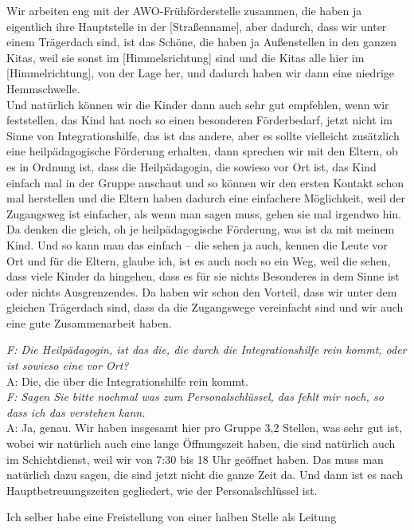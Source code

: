 \begin{linenumbers*}
Wir arbeiten eng mit der AWO-Frühförderstelle zusammen, die haben ja eigentlich
ihre Hauptstelle in der {[Straßenname]}, aber dadurch, dass wir unter einem Trägerdach sind, ist das Schöne, die haben ja Außenstellen in den ganzen Kitas, weil sie sonst im {[Himmelsrichtung]} sind und die Kitas alle hier im {[Himmelrichtung]}, von der Lage her, und dadurch haben wir dann eine niedrige Hemmschwelle.\\
Und natürlich können wir die Kinder dann auch sehr gut empfehlen, wenn wir feststellen, das Kind hat noch so einen besonderen Förderbedarf, jetzt nicht im Sinne von Integrationshilfe, das ist das andere, aber es sollte vielleicht zusätzlich eine heilpädagogische Förderung erhalten, dann sprechen wir mit den Eltern, ob es in Ordnung ist, dass die Heilpädagogin, die sowieso vor Ort ist, das Kind einfach mal in der Gruppe anschaut und so können wir den ersten Kontakt schon mal herstellen und die Eltern haben dadurch eine einfachere Möglichkeit, weil der Zugangsweg ist einfacher, als wenn man sagen muss, gehen sie mal irgendwo hin.\\
Da denken die gleich, oh je heilpädagogische Förderung, was ist da mit meinem Kind. Und so kann man das einfach -- die sehen ja auch, kennen die Leute vor Ort und für die Eltern, glaube ich, ist es auch noch so ein Weg, weil die sehen, dass viele Kinder da hingehen, dass es für sie nichts Besonderes in dem Sinne ist oder nichts Ausgrenzendes. Da haben wir schon den Vorteil, dass wir unter dem gleichen Trägerdach sind, dass da die Zugangswege vereinfacht sind und wir auch eine gute Zusammenarbeit haben. 

\emph{F: Die Heilpädagogin, ist das die, die durch die Integrationshilfe rein kommt, oder ist sowieso eine vor Ort?}\\
A: Die, die über die Integrationshilfe rein kommt.\\

\emph{F: Sagen Sie bitte nochmal was zum Personalschlüssel, das fehlt mir noch, so dass ich das verstehen kann.}\\
A: Ja, genau. Wir haben insgesamt hier pro Gruppe 3,2 Stellen, was sehr gut ist, wobei wir natürlich auch eine lange Öffnungszeit haben, die sind natürlich auch im Schichtdienst, weil wir von 7:30 bis 18 Uhr geöffnet haben. Das muss man natürlich dazu sagen, die sind jetzt nicht die ganze Zeit da. Und dann ist es nach Hauptbetreuungszeiten gegliedert, wie der Personalschlüssel ist. 

Ich selber habe eine Freistellung von einer halben Stelle als Leitung 


\end{linenumbers*}
